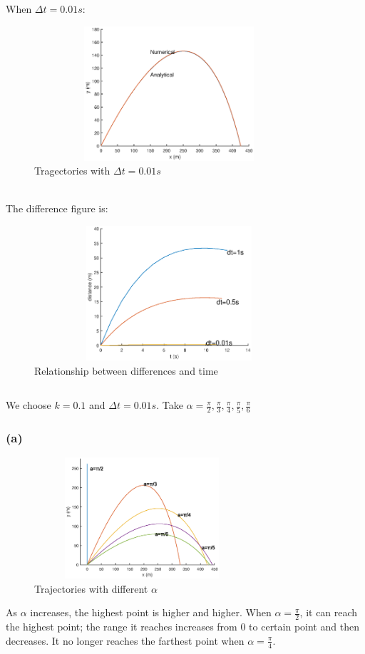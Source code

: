 \documentclass{article}
\begin{document}
\newpage
\noindent When $\Delta t=0.01s$:
\begin{figure}[!htb] 
\centering 
\includegraphics[height=5cm,width=10cm]{linear_figure2_3.eps}
\caption{Tragectories with $\Delta t=0.01s$} 
\end{figure}
\\The difference figure is:
\begin{figure}[!htb] 
\centering 
\includegraphics[height=5cm,width=10cm]{linear_figure2_4.eps}
\caption{Relationship between differences and time}
\end{figure}
\subsection{}
We choose $k=0.1$ and $\Delta t=0.01s$. Take $\alpha=\frac{\pi}{2},\frac{\pi}{3},\frac{\pi}{4},\frac{\pi}{5},\frac{\pi}{6}$
\subsubsection*{(a)}
\begin{figure}[!htb] 
\centering 
\includegraphics[height=4.5cm,width=8cm]{linear_figure3_1.eps}
\caption{Trajectories with different $\alpha$}
\end{figure}
\noindent As $\alpha$ increases, the highest point is higher and higher. When $\alpha=\frac{\pi}{2}$, it can reach the highest point; the range it reaches increases from 0 to certain point and then decreases. It no longer reaches the farthest point when $\alpha=\frac{\pi}{4}$.
\end{document}
